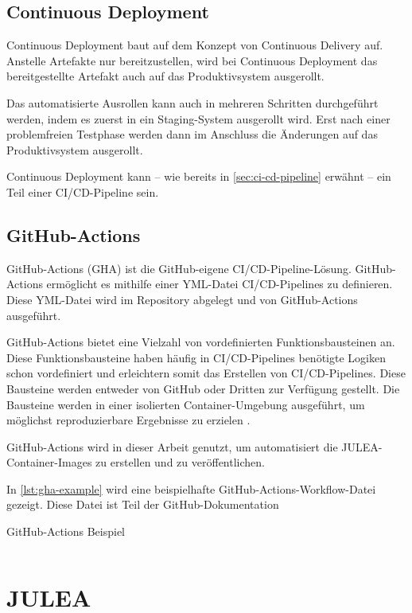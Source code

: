 \subsection{Continuous Deployment}

Continuous Deployment baut auf dem Konzept von Continuous Delivery auf. Anstelle Artefakte nur bereitzustellen, wird bei Continuous Deployment das bereitgestellte Artefakt auch auf das Produktivsystem ausgerollt.

Das automatisierte Ausrollen kann auch in mehreren Schritten durchgeführt werden, indem es zuerst in ein Staging-System ausgerollt wird. Erst nach einer problemfreien Testphase werden dann im Anschluss die Änderungen auf das Produktivsystem ausgerollt. 

Continuous Deployment kann – wie bereits in \cref{sec:ci-cd-pipeline} erwähnt – ein Teil einer CI/CD-Pipeline sein.

\subsection{GitHub-Actions}

GitHub-Actions (GHA) ist die GitHub-eigene CI/CD-Pipeline-Lösung. GitHub-Actions ermöglicht es mithilfe einer YML-Datei CI/CD-Pipelines zu definieren. Diese YML-Datei wird im Repository abgelegt und von GitHub-Actions ausgeführt. 

GitHub-Actions bietet eine Vielzahl von vordefinierten Funktionsbausteinen an. Diese Funktionsbausteine haben häufig in CI/CD-Pipelines benötigte Logiken schon vordefiniert und erleichtern somit das Erstellen von CI/CD-Pipelines. Diese Bausteine werden entweder von GitHub oder Dritten zur Verfügung gestellt. Die Bausteine werden in einer isolierten Container-Umgebung ausgeführt, um möglichst reproduzierbare Ergebnisse zu erzielen \cite{githubGitHubActions}.

GitHub-Actions wird in dieser Arbeit genutzt, um automatisiert die JULEA-Container-Images zu erstellen und zu veröffentlichen.

In \cref{lst:gha-example} wird eine beispielhafte GitHub-Actions-Workflow-Datei gezeigt. Diese Datei ist Teil der GitHub-Dokumentation \cite{githubSchnellstartFuerGitHub}

\begin{listing}[H]
    \caption{GitHub-Actions Beispiel}
    \label{lst:gha-example}
    \inputminted{yaml}{./code-examples/gha.yml}
\end{listing}


\section{JULEA}

